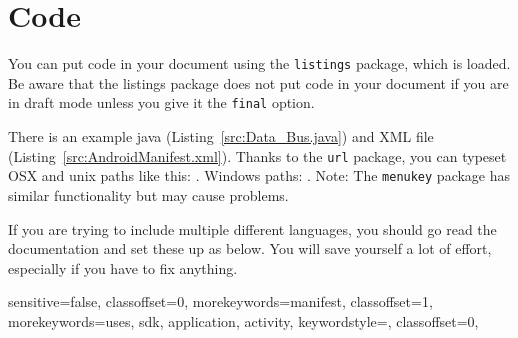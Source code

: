 \chapter{Code}\label{cha:code}
You can put code in your document using the \texttt{listings} package, which is
loaded.  Be aware that the listings
package does not put code in your document if you are in draft mode
unless you give it the \texttt{final} option.

There is an example java (Listing~\ref{src:Data_Bus.java}) and XML
file (Listing~\ref{src:AndroidManifest.xml}). Thanks to the
\texttt{url} package, you can typeset OSX and unix paths like this:
. Windows paths:
. Note: The \texttt{menukey} package has
similar functionality but may cause problems.

If you are trying to include multiple different languages, you should
go read the documentation and set these up as below.  You
will save yourself a lot of effort, especially if you have to fix
anything.

\lstset{%
  language=,%
  style=default,
}


%
{  %
  sensitive=false,%
  classoffset=0,  %
  morekeywords={manifest},
  classoffset=1,  %
  morekeywords={uses, sdk, application, activity},
  keywordstyle=\color{blue}, %
  classoffset=0, %
}


